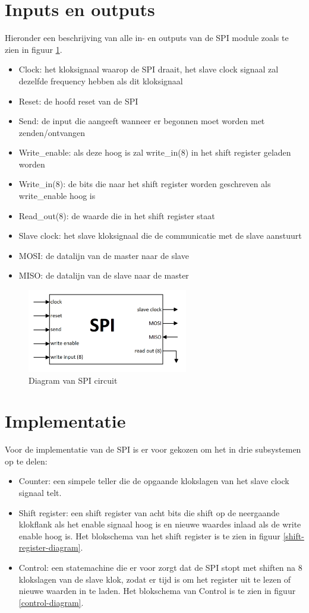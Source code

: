 \documentclass[oneside,dutch]{tudelft-report}
\begin{document}
\section{Inputs en outputs}
Hieronder een beschrijving van alle in- en outputs van de SPI module zoals te zien in figuur \ref{spi-diagram}.
\begin{itemize}
\item Clock: het kloksignaal waarop de SPI draait, het slave clock signaal zal dezelfde frequency hebben als dit kloksignaal
\item Reset: de hoofd reset van de SPI
\item Send: de input die aangeeft wanneer er begonnen moet worden met zenden/ontvangen
\item Write\_enable: als deze hoog is zal write\_in(8) in het shift register geladen worden
\item Write\_in(8): de bits die naar het shift register worden geschreven als write\_enable hoog is
\item Read\_out(8): de waarde die in het shift register staat
\item Slave clock: het slave kloksignaal die de communicatie met de slave aanstuurt
\item MOSI: de datalijn van de master naar de slave
\item MISO: de datalijn van de slave naar de master
\end{itemize}

\begin{figure}[H]
\center
\includegraphics[width=7cm]{./spi_diagram}
\caption{Diagram van SPI circuit}
\label{spi-diagram}
\end{figure}

\section{Implementatie}
Voor de implementatie van de SPI is er voor gekozen om het in drie subsystemen op te delen:
\begin{itemize}
\item Counter: een simpele teller die de opgaande klokslagen van het slave clock signaal telt. 
\item Shift register: een shift register van acht bits die shift op de neergaande klokflank als het enable signaal hoog is en nieuwe waardes inlaad als de write enable hoog is. Het blokschema van het shift register is te zien in figuur \ref{shift-register-diagram}.
\item Control: een statemachine die er voor zorgt dat de SPI stopt met shiften na 8 klokslagen van de slave klok, zodat er tijd is om het register uit te lezen of nieuwe waarden in te laden. Het blokschema van Control is te zien in figuur \ref{control-diagram}.
\end{itemize}
\end{document}
